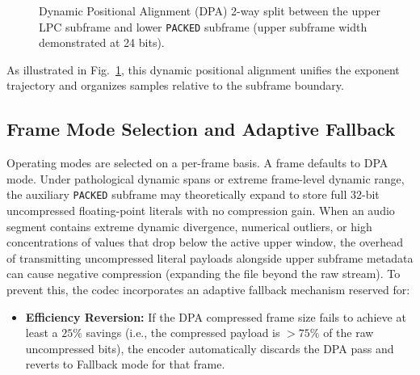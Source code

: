 \documentclass[10pt,twocolumn]{article}
\begin{document}
\begin{figure}[!ht]
{%
	}
	\caption{Dynamic Positional Alignment (DPA) 2-way split between the upper LPC subframe and lower \texttt{PACKED} subframe (upper subframe width demonstrated at 24 bits).}
	\label{fig:subframe_alignment}
\end{figure}

As illustrated in Fig.~\ref{fig:subframe_alignment}, this dynamic positional alignment unifies the exponent trajectory and organizes samples relative to the subframe boundary.

\subsection{Frame Mode Selection and Adaptive Fallback}
Operating modes are selected on a per-frame basis. A frame defaults to DPA mode. Under pathological dynamic spans or extreme frame-level dynamic range, the auxiliary \texttt{PACKED} subframe may theoretically expand to store full 32-bit uncompressed floating-point literals with no compression gain. When an audio segment contains extreme dynamic divergence, numerical outliers, or high concentrations of values that drop below the active upper window, the overhead of transmitting uncompressed literal payloads alongside upper subframe metadata can cause negative compression (expanding the file beyond the raw stream). To prevent this, the codec incorporates an adaptive fallback mechanism reserved for:
\begin{itemize}
	\item \textbf{Efficiency Reversion:} If the DPA compressed frame size fails to achieve at least a $25\%$ savings (i.e., the compressed payload is $>75\%$ of the raw uncompressed bits), the encoder automatically discards the DPA pass and reverts to Fallback mode for that frame.
\end{itemize}
\end{document}
